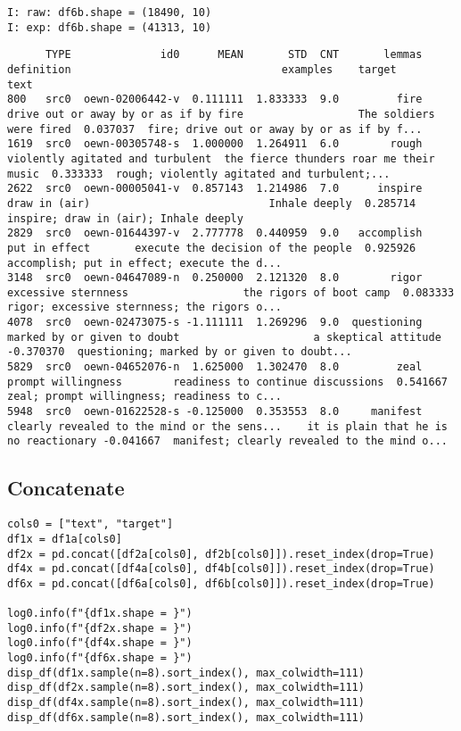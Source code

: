 \documentclass[a4paper,10pt,onecolumn,oneside,openright]{article}
\begin{document}
\begin{verbatim}
I: raw: df6b.shape = (18490, 10)
I: exp: df6b.shape = (41313, 10)
\end{verbatim}
\begin{verbatim}
      TYPE              id0      MEAN       STD  CNT       lemmas                                   definition                                 examples    target                                         text
800   src0  oewn-02006442-v  0.111111  1.833333  9.0         fire        drive out or away by or as if by fire                  The soldiers were fired  0.037037  fire; drive out or away by or as if by f...
1619  src0  oewn-00305748-s  1.000000  1.264911  6.0        rough             violently agitated and turbulent  the fierce thunders roar me their music  0.333333  rough; violently agitated and turbulent;...
2622  src0  oewn-00005041-v  0.857143  1.214986  7.0      inspire                                draw in (air)                            Inhale deeply  0.285714        inspire; draw in (air); Inhale deeply
2829  src0  oewn-01644397-v  2.777778  0.440959  9.0   accomplish                                put in effect       execute the decision of the people  0.925926  accomplish; put in effect; execute the d...
3148  src0  oewn-04647089-n  0.250000  2.121320  8.0        rigor                          excessive sternness                  the rigors of boot camp  0.083333  rigor; excessive sternness; the rigors o...
4078  src0  oewn-02473075-s -1.111111  1.269296  9.0  questioning                  marked by or given to doubt                     a skeptical attitude -0.370370  questioning; marked by or given to doubt...
5829  src0  oewn-04652076-n  1.625000  1.302470  8.0         zeal                           prompt willingness        readiness to continue discussions  0.541667  zeal; prompt willingness; readiness to c...
5948  src0  oewn-01622528-s -0.125000  0.353553  8.0     manifest  clearly revealed to the mind or the sens...    it is plain that he is no reactionary -0.041667  manifest; clearly revealed to the mind o...
\end{verbatim}
\subsection{Concatenate}
\label{sec:org8e48320}
\begin{verbatim}
cols0 = ["text", "target"]
df1x = df1a[cols0]
df2x = pd.concat([df2a[cols0], df2b[cols0]]).reset_index(drop=True)
df4x = pd.concat([df4a[cols0], df4b[cols0]]).reset_index(drop=True)
df6x = pd.concat([df6a[cols0], df6b[cols0]]).reset_index(drop=True)

log0.info(f"{df1x.shape = }")
log0.info(f"{df2x.shape = }")
log0.info(f"{df4x.shape = }")
log0.info(f"{df6x.shape = }")
disp_df(df1x.sample(n=8).sort_index(), max_colwidth=111)
disp_df(df2x.sample(n=8).sort_index(), max_colwidth=111)
disp_df(df4x.sample(n=8).sort_index(), max_colwidth=111)
disp_df(df6x.sample(n=8).sort_index(), max_colwidth=111)
\end{verbatim}
\end{document}
